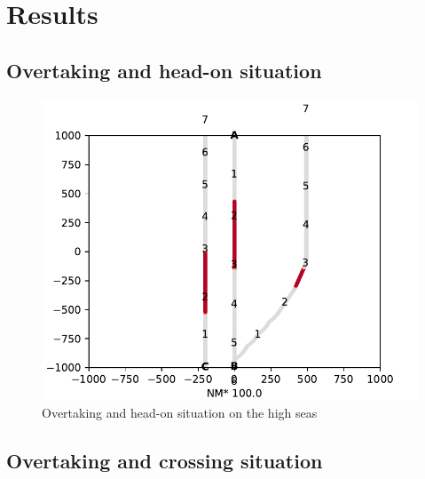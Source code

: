 

\chapter{Results}
\section{Overtaking and head-on situation}
\begin{figure}[H]
    \centering
    \includegraphics[width=\textwidth,height=0.75\textheight,keepaspectratio]{Figures/Scenario/overtaking-and-head-on-res.pdf}
    \caption{Overtaking and head-on situation on the high seas }
    \label{fig:overtaking-and-head-on-res}
\end{figure}
\section{Overtaking and crossing situation}

